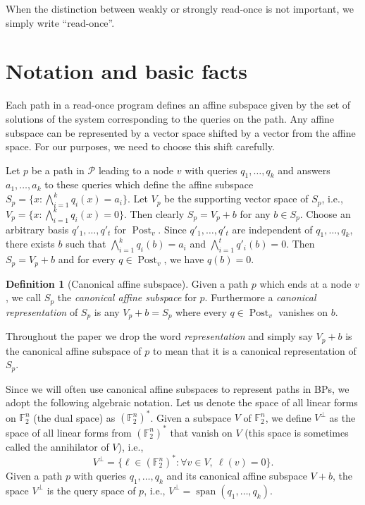 \documentclass[a4paper,11pt,draft]{article}
\theoremstyle{definition}
\newtheorem{definition}[theorem]{Definition}
\theoremstyle{remark}
\DeclareMathOperator{\Span}{span}
\DeclareMathOperator{\post}{Post}
\newcommand{\dual}[1]{{#1}^{*}}
\newcommand{\orth}[1]{{#1}^{\perp}}
\newcommand{\bbF}{\mathbb{F}}
\newcommand{\calP}{\mathcal{P}}
\newcommand{\readonce}{read-once}
\begin{document}
When the distinction between weakly or strongly read-once is not important, we simply write ``read-once''.



\section{Notation and basic facts}

Each path in a \readonce{} program defines an affine subspace given by the set of solutions of the system corresponding to the queries on the path. Any affine subspace can be represented by a vector space shifted by a vector from the affine space. For our purposes, we need to choose this shift carefully. 

Let $p$ be a path in $\calP$ leading to a node $v$ with queries $q_1, \ldots, q_k$ and answers $a_1, \ldots, a_k$ to these queries which define the affine subspace $S_p = \{x:\bigwedge_{i=1}^k q_i(x) = a_i\}$. Let $V_p$ be the supporting vector space of $S_p$, i.e., $V_p = \{x : \bigwedge_{i = 1}^k q_i(x) = 0\}$. Then clearly $S_p = V_p + b$ for any $b \in S_p$. Choose an arbitrary basis $q'_1, \ldots, q'_t$ for $\post_v$. Since $q'_1, \ldots, q'_t$ are independent of $q_1, \ldots, q_k$, there exists $b$ such that $\bigwedge_{i=1}^k q_i(b) = a_i$ and $\bigwedge_{i = 1}^t q'_i(b) = 0$. Then $S_p = V_p + b$ and for every $q \in \post_v$, we have $q(b) = 0$.

\begin{definition}[Canonical affine subspace] 
Given a path $p$ which ends at a node $v$, we call $S_p$ the \emph{canonical affine subspace} for $p$. Furthermore a \emph{canonical representation} of $S_p$ is any $V_p + b = S_p$ where every $q \in \post_v$ vanishes on $b$.
%
\end{definition}

Throughout the paper we drop the word \emph{representation} and simply say $V_p + b$ is the canonical affine subspace of $p$
 to mean that it is a canonical representation of $S_p$.
%

Since we will often use canonical affine subspaces to represent paths in BPs, we adopt the following algebraic notation.
Let us denote the space of all linear forms on $\bbF_2^n$ (the dual space) as $\dual{(\bbF_2^n)}$.
Given a subspace $V$ of $\bbF_2^n$, we define $\orth{V}$ as the space of all linear forms from $\dual{(\bbF_2^n)}$ that vanish on $V$ (this space is sometimes called the annihilator of $V$), i.e.,
\[
  \orth{V} = \{\ell \in \dual{(\bbF_2^n)} : \forall v \in V,\ \ell(v) = 0\}.
\]
Given a path $p$ with queries $q_1, \ldots, q_k$ and its canonical affine subspace $V+b$, the space $\orth{V}$ is the query space of $p$, i.e., $\orth{V} = \Span(q_1, \ldots, q_k)$.
\end{document}
